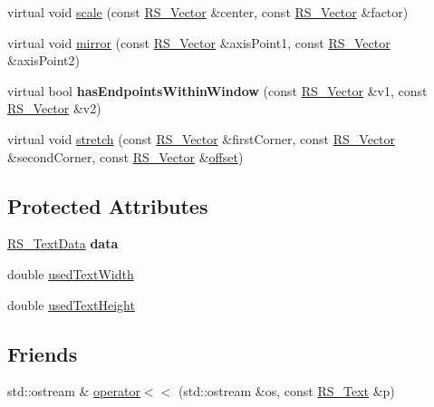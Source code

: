 \begin{DoxyCompactItemize}
\item 
virtual void \hyperlink{classRS__Text_a5505733c6ba5c87b4e6c01866409b5d4}{scale} (const \hyperlink{classRS__Vector}{R\-S\-\_\-\-Vector} \&center, const \hyperlink{classRS__Vector}{R\-S\-\_\-\-Vector} \&factor)
\item 
virtual void \hyperlink{classRS__Text_a3f3271dfa194b086b68c9dc8c60ddd8a}{mirror} (const \hyperlink{classRS__Vector}{R\-S\-\_\-\-Vector} \&axis\-Point1, const \hyperlink{classRS__Vector}{R\-S\-\_\-\-Vector} \&axis\-Point2)
\item 
\hypertarget{classRS__Text_aa7fa1cceaaed85729feb74995d4337d6}{virtual bool {\bfseries has\-Endpoints\-Within\-Window} (const \hyperlink{classRS__Vector}{R\-S\-\_\-\-Vector} \&v1, const \hyperlink{classRS__Vector}{R\-S\-\_\-\-Vector} \&v2)}\label{classRS__Text_aa7fa1cceaaed85729feb74995d4337d6}

\item 
virtual void \hyperlink{classRS__Text_adcb747d3c54809c19cefd989edb810ea}{stretch} (const \hyperlink{classRS__Vector}{R\-S\-\_\-\-Vector} \&first\-Corner, const \hyperlink{classRS__Vector}{R\-S\-\_\-\-Vector} \&second\-Corner, const \hyperlink{classRS__Vector}{R\-S\-\_\-\-Vector} \&\hyperlink{classRS__Entity_aa296d21b9aac99161d386ce2f60f0fea}{offset})
\end{DoxyCompactItemize}
\subsection*{Protected Attributes}
\begin{DoxyCompactItemize}
\item 
\hypertarget{classRS__Text_abc8505bf2eb61e9c64d94088a2d57511}{\hyperlink{classRS__TextData}{R\-S\-\_\-\-Text\-Data} {\bfseries data}}\label{classRS__Text_abc8505bf2eb61e9c64d94088a2d57511}

\item 
double \hyperlink{classRS__Text_a5d903094e0ce9d102cf7e10bbf8d4595}{used\-Text\-Width}
\item 
double \hyperlink{classRS__Text_a2672c8b8c322348cf476d64bb719b726}{used\-Text\-Height}
\end{DoxyCompactItemize}
\subsection*{Friends}
\begin{DoxyCompactItemize}
\item 
std\-::ostream \& \hyperlink{classRS__Text_a7820eae61e0f55687a8dc7b6e19afb32}{operator$<$$<$} (std\-::ostream \&os, const \hyperlink{classRS__Text}{R\-S\-\_\-\-Text} \&p)
\end{DoxyCompactItemize}

